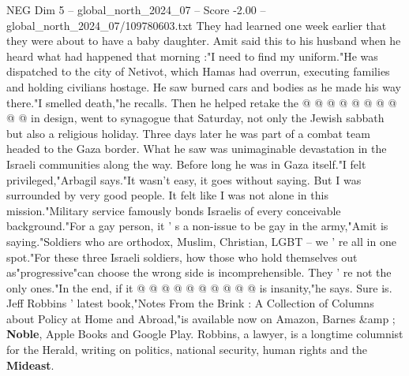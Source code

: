 \begin{textsample}{NEG Dim 5 – global\_north\_2024\_07 – Score -2.00 – global\_north\_2024\_07/109780603.txt}
They had learned one week earlier that they were about to have a baby daughter.
Amit said this to his husband when he heard what had happened that morning :"I need to find my uniform."He was dispatched to the city of Netivot, which Hamas had overrun, executing families and holding civilians hostage.
He saw burned cars and bodies as he made his way there."I smelled death,"he recalls.
Then he helped retake the @ @ @ @ @ @ @ @ @ @ in design, went to synagogue that Saturday, not only the Jewish sabbath but also a religious holiday.
Three days later he was part of a combat team headed to the Gaza border.
What he saw was unimaginable devastation in the Israeli communities along the way.
Before long he was in Gaza itself."I felt privileged,"Arbagil says."It wasn't easy, it goes without saying.
But I was surrounded by very good people.
It felt like I was not alone in this mission."Military service famously bonds Israelis of every conceivable background."For a gay person, it ' s a non-issue to be gay in the army,"Amit is saying."Soldiers who are orthodox, Muslim, Christian, LGBT -- we ' re all in one spot."For these three Israeli soldiers, how those who hold themselves out as"progressive"can choose the wrong side is incomprehensible.
They ' re not the only ones."In the end, if it @ @ @ @ @ @ @ @ @ @ is insanity,"he says.
Sure is.
Jeff Robbins ' latest book,"Notes From the Brink : A Collection of Columns about Policy at Home and Abroad,"is available now on Amazon, Barnes \&amp ; \textbf{Noble}, Apple Books and Google Play.
Robbins, a lawyer, is a longtime columnist for the Herald, writing on politics, national security, human rights and the \textbf{Mideast}.

\end{textsample}
